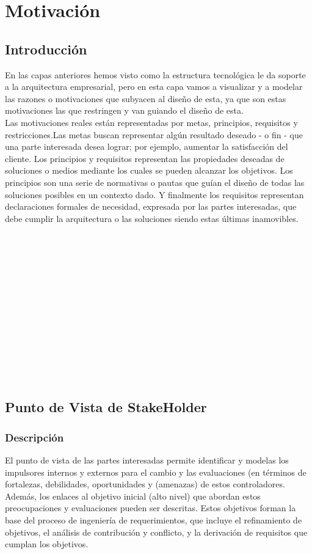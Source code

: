 \chapter{Motivación}


\section{Introducción}
En las capas anteriores hemos visto como la estructura tecnológica le da soporte a la arquitectura empresarial, pero en esta capa vamos a visualizar y a modelar las razones o motivaciones que subyacen al diseño de esta, ya que son estas motivaciones las que restringen y van guiando el diseño de esta.\\
Las motivaciones reales están representadas por metas, principios, requisitos y restricciones.Las metas buscan representar algún resultado deseado - o fin - que una parte interesada desea lograr; por ejemplo, aumentar la satisfacción del cliente. 
Los principios y requisitos representan las propiedades deseadas de soluciones  o medios  mediante los cuales se pueden alcanzar los objetivos. 
Los principios son una serie de normativas  o pautas que guían el diseño de todas las soluciones posibles en un contexto dado. Y finalmente los requisitos representan declaraciones formales de necesidad, expresada por las partes interesadas, que debe cumplir la arquitectura o las soluciones siendo estas últimas inamovibles.\\
\\
\\
\\
\\
\\
\\
\\
\\
\\
\\
\\
\\
\\



\section{Punto de Vista de StakeHolder}
\subsection{Descripción}
El punto de vista de las partes interesadas permite identificar y modelas los impulsores internos y externos para el cambio y las evaluaciones (en términos de fortalezas, debilidades, oportunidades y (amenazas) de estos controladores. 
Además, los enlaces al objetivo inicial (alto nivel)  que abordan estos preocupaciones y evaluaciones pueden ser descritas. Estos objetivos forman la base del proceso de ingeniería de requerimientos, que incluye el refinamiento de objetivos, el análisis de contribución y conflicto, y la derivación de requisitos que cumplan los objetivos.


